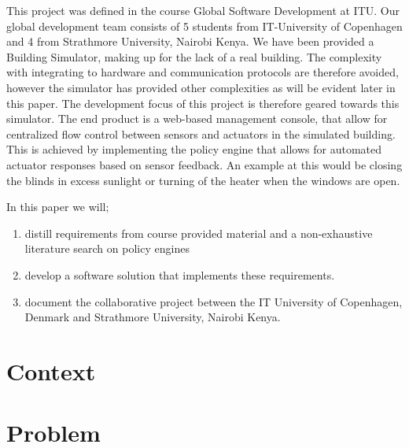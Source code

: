 This project was defined in the course Global Software Development at ITU. Our global development team consists of 5 students from IT-University of Copenhagen and 4 from Strathmore University, Nairobi Kenya. We have been provided a Building Simulator, making up for the lack of a real building. The complexity with integrating to hardware and communication protocols are therefore avoided, however the simulator has provided other complexities as will be evident later in this paper. The development focus of this project is therefore geared towards this simulator. The end product is a web-based management console, that allow for centralized flow control between sensors and actuators in the simulated building. This is achieved by implementing the policy engine that allows for automated actuator responses based on sensor feedback. An example at this would be closing the blinds in excess sunlight or turning of the heater when the windows are open.

In this paper we will; 
\begin{enumerate}
	\item distill requirements from course provided material and a non-exhaustive literature search on policy engines
	\item develop a software solution that implements these requirements.
	\item document the collaborative project between the IT University of Copenhagen, Denmark and Strathmore University, Nairobi Kenya.
\end{enumerate}

\section{Context}

\section{Problem}
